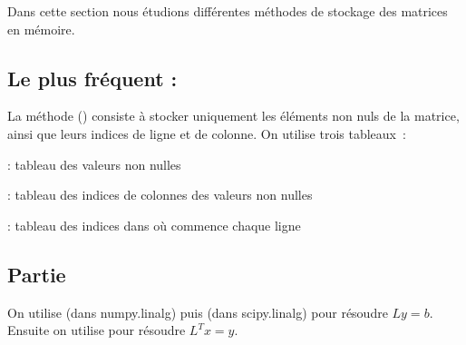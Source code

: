 Dans cette section nous étudions différentes méthodes de stockage des matrices en mémoire.

\subsection{Le plus fréquent : }

La méthode  () consiste à stocker uniquement les éléments non nuls de la matrice, ainsi que leurs indices de ligne et de colonne. On utilise trois tableaux~:
\begin{enumeratebf}
    \item {} : tableau des valeurs non nulles
    \item {} : tableau des indices de colonnes des valeurs non nulles
    \item {} : tableau des indices dans  où commence chaque ligne
\end{enumeratebf}

\subsection{Partie }

On utilise  (dans numpy.linalg)
puis  (dans scipy.linalg) pour résoudre $Ly = b$.
Ensuite on utilise  pour résoudre $L^T x = y$.
